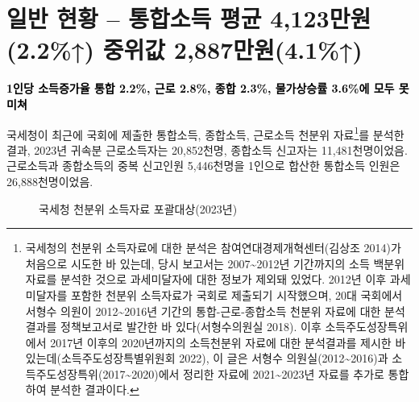 \documentclass[
  a4paper,
  oneside,
  open=any]{scrbook}
\let\oldtextbf\textbf
\renewcommand{\textbf}[1]{\textcolor{black}{\oldtextbf{#1}}}
\renewcommand*\contentsname{Table of contents}
\newcommand\contentsname{Table of contents}
\begin{document}
\restoregeometry

\cleardoublepage
{}


\renewcommand*\contentsname{차례}
{
\setcounter{tocdepth}{2}
\tableofcontents
}

\mainmatter
\section{일반 현황 -- 통합소득 평균 4,123만원(2.2\%↑) 중위값
2,887만원(4.1\%↑)}\label{uxc77cuxbc18-uxd604uxd669-uxd1b5uxd569uxc18cuxb4dd-uxd3c9uxade0-4123uxb9ccuxc6d02.2-uxc911uxc704uxac12-2887uxb9ccuxc6d04.1}

\textbf{1인당 소득증가율 통합 2.2\%, 근로 2.8\%, 종합 2.3\%, 물가상승률
3.6\%에 모두 못미쳐}

국세청이 최근에 국회에 제출한 통합소득, 종합소득, 근로소득 천분위
자료\footnote{국세청의 천분위 소득자료에 대한 분석은
  참여연대경제개혁센터(김상조 2014)가 처음으로 시도한 바 있는데, 당시
  보고서는 2007\textasciitilde2012년 기간까지의 소득 백분위 자료를
  분석한 것으로 과세미달자에 대한 정보가 제외돼 있었다. 2012년 이후
  과세미달자를 포함한 천분위 소득자료가 국회로 제출되기 시작했으며, 20대
  국회에서 서형수 의원이 2012\textasciitilde2016년 기간의
  통합-근로-종합소득 천분위 자료에 대한 분석결과를 정책보고서로 발간한
  바 있다(서형수의원실 2018). 이후 소득주도성장특위에서 2017년 이후의
  2020년까지의 소득천분위 자료에 대한 분석결과를 제시한 바
  있는데(소득주도성장특별위원회 2022), 이 글은 서형수
  의원실(2012\textasciitilde2016)과
  소득주도성장특위(2017\textasciitilde2020)에서 정리한 자료에
  2021\textasciitilde2023년 자료를 추가로 통합하여 분석한 결과이다.}를
분석한 결과, 2023년 귀속분 근로소득자는 20,852천명, 종합소득 신고자는
11,481천명이었음. 근로소득과 종합소득의 중복 신고인원 5,446천명을
1인으로 합산한 통합소득 인원은 26,888천명이었음.

\begin{figure}

\caption{\label{fig-first1}국세청 천분위 소득자료 포괄대상(2023년)}


\end{figure}%
\end{document}
